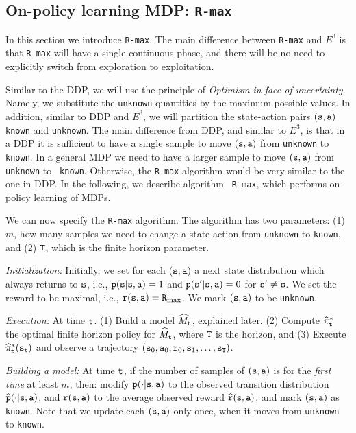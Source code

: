 \subsection{On-policy learning MDP: {\tt R-max}}

In this section we introduce {\tt R-max}. The main difference
between {\tt R-max} and $E^3$ is that {\tt R-max} will have a single
continuous phase, and there will be no need to explicitly switch
from exploration to exploitation.

Similar to the DDP, we will use the principle of {\em Optimism in
face of uncertainty}. Namely, we substitute the \texttt{unknown} quantities
by the maximum possible values.
%
In addition, similar to DDP and $E^3$, we will partition the
state-action pairs $({\tt s},{\tt a})$ \texttt{known} and \texttt{unknown}.
%
The main difference from DDP, and similar to $E^3$, is that in a DDP
it is sufficient to have a single sample to move $({\tt s},{\tt a})$
from \texttt{unknown} to \texttt{known}. In a general MDP we need to have a
larger sample to move $({\tt s},{\tt a})$ from \texttt{unknown} to {\tt
known}. Otherwise, the {\tt R-max} algorithm would be very similar
to the one in DDP. In the following, we describe algorithm {\tt
R-max}, which performs on-policy learning of MDPs.

We can now specify the {\tt R-max} algorithm. The algorithm has two
parameters: (1) $m$, how many samples we need to change a
state-action from \texttt{unknown} to \texttt{known}, and (2) ${\tt T}$, which is
the finite horizon parameter.

{\em Initialization:} Initially, we set for each $({\tt s},{\tt a})$
a next state distribution which always returns to ${\tt s}$, i.e.,
${\tt p}({\tt s}|{\tt s},{\tt a})=1$ and ${\tt p}({\tt s}'|{\tt s},{\tt a})=0$ for
${\tt s}'\neq {\tt s}$. We set the reward to be maximal, i.e.,
${\tt r}({\tt s},{\tt a})={\tt R}_{\max }$. We mark $({\tt s},{\tt a})$ to be
\texttt{unknown}.

{\em Execution:} At time ${\tt t}$. (1) Build a model
$\widehat{M}_{\tt t}$, explained later. (2) Compute
$\widehat{\pi}^*_{\tt t}$ the optimal finite horizon policy for
$\widehat{M}_{\tt t}$, where ${\tt T}$ is the horizon, and (3) Execute
$\widehat{\pi}^*_{\tt t}({\tt s}_{\tt t})$ and
observe a trajectory $({\tt s}_0,{\tt a}_0,{\tt r}_0,{\tt s}_1, \ldots, {\tt s}_{\tt T})$.

{\em Building a model:} At time ${\tt t}$, if the number of samples
of $({\tt s},{\tt a})$ is for the {\em first time} at least $m$,
then: modify ${\tt p}(\cdot|{\tt s},{\tt a})$ to the observed transition
distribution $\widehat{{\tt p}}(\cdot|{\tt s},{\tt a})$, and ${\tt r}({\tt s},{\tt a})$ to the average observed
reward $\widehat{{\tt r}}({\tt s},{\tt a})$, and mark $({\tt s},{\tt a})$ as {\tt
known}. Note that we update each $({\tt s},{\tt a})$ only once, when
it moves from \texttt{unknown} to \texttt{known}.

